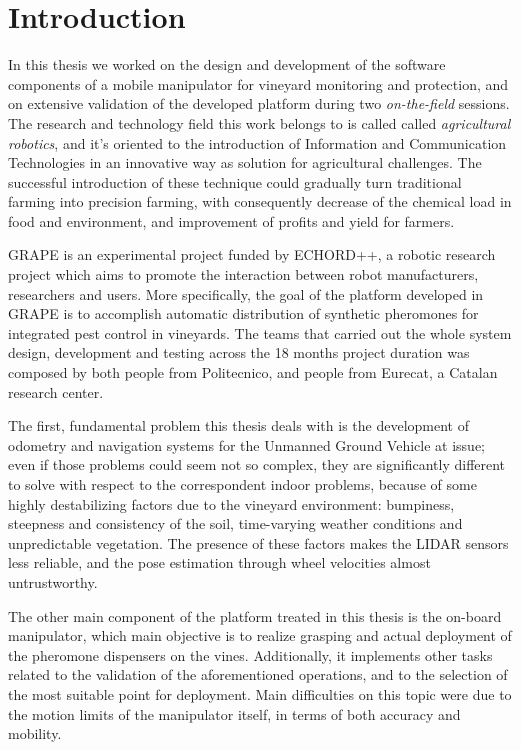 
\chapter{Introduction} \label{chap:introduction}

In this thesis we worked on the design and development of the software components of a mobile manipulator for vineyard monitoring and protection, and on extensive validation of the developed platform during two \textit{on-the-field} sessions. The research and technology field this work belongs to is called called  \textit{agricultural robotics}, and it's oriented to the introduction of Information and Communication Technologies in an innovative way as solution for agricultural challenges. The successful introduction of these technique could gradually turn traditional farming into precision farming, with consequently decrease of the chemical load in food and environment, and improvement of profits and yield for farmers.

\par \ac{GRAPE} is an experimental project funded by \ac{ECHORD++}, a robotic research project which aims to promote the interaction between robot manufacturers, researchers and users. More specifically, the goal of the platform developed in \ac{GRAPE} is to accomplish automatic distribution of synthetic pheromones for integrated pest control in vineyards.
The teams that carried out the whole system design, development and testing across the 18 months project duration was composed by both people from Politecnico, and people from Eurecat, a Catalan research center. 

The first, fundamental problem this thesis deals with is the development of odometry and navigation systems for the Unmanned Ground Vehicle at issue; even if those problems could seem not so complex, they are significantly different to solve with respect to the correspondent indoor problems, because of some highly destabilizing factors due to the vineyard environment: bumpiness, steepness and consistency of the soil, time-varying weather conditions and unpredictable vegetation. The presence of these factors makes the \ac{LIDAR} sensors less reliable, and the pose estimation through wheel velocities almost untrustworthy.

The other main component of the platform treated in this thesis is the on-board manipulator, which main objective is to realize grasping and actual deployment of the pheromone dispensers on the vines. Additionally, it implements other tasks related to the validation of the aforementioned operations, and to the selection of the most suitable point for deployment. Main difficulties on this topic were due to the motion limits of the manipulator itself, in terms of both accuracy and mobility.

